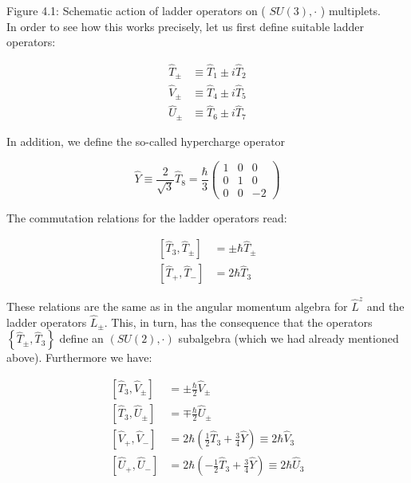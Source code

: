 \documentclass[10pt, letterpaper]{article}
\begin{document}
Figure 4.1: Schematic action of ladder operators on ( $S U(3), \cdot$ ) multiplets.\\
In order to see how this works precisely, let us first define suitable ladder operators:

$$
\begin{aligned}
\hat{T}_{ \pm} & \equiv \hat{T}_{1} \pm i \hat{T}_{2} \\
\hat{V}_{ \pm} & \equiv \hat{T}_{4} \pm i \hat{T}_{5} \\
\hat{U}_{ \pm} & \equiv \hat{T}_{6} \pm i \hat{T}_{7}
\end{aligned}
$$

In addition, we define the so-called hypercharge operator

$$
\hat{Y} \equiv \frac{2}{\sqrt{3}} \hat{T}_{8}=\frac{\hbar}{3}\left(\begin{array}{ccc}
1 & 0 & 0 \\
0 & 1 & 0 \\
0 & 0 & -2
\end{array}\right)
$$

The commutation relations for the ladder operators read:

$$
\begin{aligned}
{\left[\hat{T}_{3}, \hat{T}_{ \pm}\right] } & = \pm \hbar \hat{T}_{ \pm} \\
{\left[\hat{T}_{+}, \hat{T}_{-}\right] } & =2 \hbar \hat{T}_{3}
\end{aligned}
$$

These relations are the same as in the angular momentum algebra for $\hat{L}^{z}$ and the ladder operators $\hat{L}_{ \pm}$. This, in turn, has the consequence that the operators $\left\{\hat{T}_{ \pm}, \hat{T}_{3}\right\}$ define an $(S U(2), \cdot)$ subalgebra (which we had already mentioned above). Furthermore we have:

$$
\begin{aligned}
{\left[\hat{T}_{3}, \hat{V}_{ \pm}\right] } & = \pm \frac{\hbar}{2} \hat{V}_{ \pm} \\
{\left[\hat{T}_{3}, \hat{U}_{ \pm}\right] } & =\mp \frac{\hbar}{2} \hat{U}_{ \pm} \\
{\left[\hat{V}_{+}, \hat{V}_{-}\right] } & =2 \hbar\left(\frac{1}{2} \hat{T}_{3}+\frac{3}{4} \hat{Y}\right) \equiv 2 \hbar \hat{V}_{3} \\
{\left[\hat{U}_{+}, \hat{U}_{-}\right] } & =2 \hbar\left(-\frac{1}{2} \hat{T}_{3}+\frac{3}{4} \hat{Y}\right) \equiv 2 \hbar \hat{U}_{3}
\end{aligned}
$$
\end{document}
